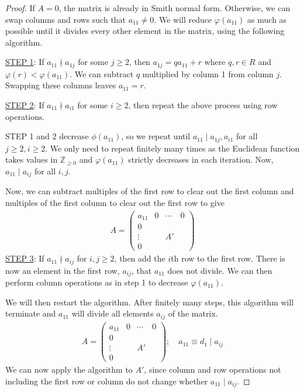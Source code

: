 \begin{proof}
	If $A = 0$, the matrix is already in Smith normal form.
	Otherwise, we can swap columns and rows such that $a_{11} \neq 0$.
	We will reduce $\varphi(a_{11})$ as much as possible until it divides every other element in the matrix, using the following algorithm.

	\underline{STEP 1}: If $a_{11} \nmid a_{1j}$ for some $j \geq 2$, then $a_{1j} = q a_{11} + r$ where $q, r \in R$ and $\varphi(r) < \varphi(a_{11})$.
	We can subtract $q$ multiplied by column 1 from column $j$.
	Swapping these columns leaves $a_{11} = r$.

	\underline{STEP 2}: If $a_{11} \nmid a_{i1}$ for some $i \geq 2$, then repeat the above process using row operations.

	STEP 1 and 2 decrease $\phi(a_{11})$, so we repeat until $a_{11} \mid a_{1j}, a_{i1}$ for all $j \geq 2, i \geq 2$.
	We only need to repeat finitely many times as the Euclidean function takes values in $\mathbb Z_{\geq 0}$ and $\varphi(a_{11})$ strictly decreases in each iteration.
	Now, $a_{11} \mid a_{ij}$ for all $i,j$.

	Now, we can subtract multiples of the first row to clear out the first column and multiples of the first column to clear out the first row to give
	\begin{align*}
		A = \begin{pmatrix}
			a_{11} & 0 & \cdots & 0 \\
			0                       \\
			\vdots &   & A'         \\
			0
		\end{pmatrix}
	\end{align*}
	\underline{STEP 3}: If $a_{11} \nmid a_{ij}$ for $i,j \geq 2$, then add the $i$th row to the first row.
	There is now an element in the first row, $a_{ij}$, that $a_{11}$ does not divide.
	We can then perform column operations as in step 1 to decrease $\varphi(a_{11})$.

	We will then restart the algorithm.
	After finitely many steps, this algorithm will terminate and $a_{11}$ will divide all elements $a_{ij}$ of the matrix.
	\begin{align*}
		A = \begin{pmatrix}
			a_{11} & 0 & \cdots & 0 \\
			0                       \\
			\vdots &   & A'         \\
			0
		\end{pmatrix};\quad a_{11} \equiv d_1 \mid a_{ij}
	\end{align*}
	We can now apply the algorithm to $A'$, since column and row operations not including the first row or column do not change whether $a_{11} \mid a_{ij}$.


\end{proof}
